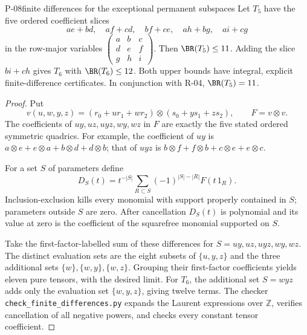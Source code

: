 \begin{finding}{P-08}{finite differences for the exceptional permanent subspaces}
Let \(T_5\) have the five ordered coefficient slices
\[
 ae+bd,\quad af+cd,\quad bf+ce,\quad ah+bg,\quad ai+cg
\]
in the row-major variables
\(\left(\begin{smallmatrix}a&b&c\\d&e&f\\g&h&i\end{smallmatrix}\right)\).
Then \(\BR(T_5)\leq11\).
Adding the slice \(bi+ch\) gives \(T_6\) with
\(\BR(T_6)\leq12\).
Both upper bounds have integral, explicit finite-difference
certificates. In conjunction with R-04, \(\BR(T_5)=11\).
\end{finding}
\begin{proof}
Put
\[
 v(u,w,y,z)=(r_0+u r_1+w r_2)\otimes(s_0+y s_1+z s_2),
 \qquad F=v\otimes v.
\]
The coefficients of \(uy,uz,uyz,wy,wz\) in \(F\) are
exactly the five stated ordered symmetric quadrics.
For example, the coefficient of \(uy\) is
\(a\otimes e+e\otimes a+b\otimes d+d\otimes b\);
that of \(uyz\) is
\(b\otimes f+f\otimes b+c\otimes e+e\otimes c\).

For a set \(S\) of parameters define
\[
 D_S(t)=t^{-|S|}
 \sum_{R\subset S}(-1)^{|S|-|R|}F(t\,1_R).
\]
Inclusion-exclusion kills every monomial with support
properly contained in \(S\); parameters outside \(S\)
are zero. After cancellation \(D_S(t)\) is polynomial
and its value at zero is the coefficient of the
squarefree monomial supported on \(S\).

Take the first-factor-labelled sum of these differences
for \(S=uy,uz,uyz,wy,wz\).
The distinct evaluation sets are the eight subsets of
\(\{u,y,z\}\) and the three additional sets
\(\{w\},\{w,y\},\{w,z\}\). Grouping their first-factor
coefficients yields eleven pure tensors, with the desired
limit. For \(T_6\), the additional set \(S=wyz\) adds only
the evaluation set \(\{w,y,z\}\), giving twelve terms.
The checker \texttt{check\_finite\_differences.py} expands
the Laurent expressions over \(\mathbb Z\), verifies
cancellation of all negative powers, and checks every
constant tensor coefficient.
\end{proof}

